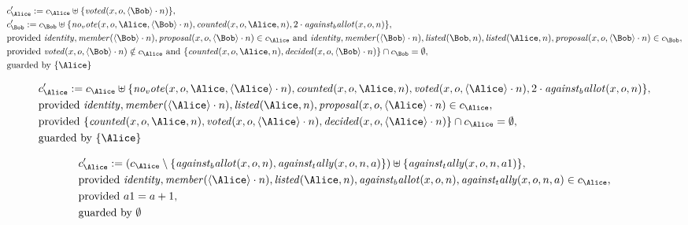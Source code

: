 \begin{align*}
&
c'_
{
\Alice
}
 := 
c_
{
\Alice
}
 \uplus 
\{
\mathit{
voted
}
(
x
,
o
,
\langle
\Bob
\rangle
\cdot
n
)
\}
,\\
&
c'_
{
\Bob
}
 := 
c_
{
\Bob
}
 \uplus 
\{
\mathit{
no_vote
}
(
x
,
o
,
\Alice
,
\langle
\Bob
\rangle
\cdot
n
)
,
\mathit{
counted
}
(
x
,
o
,
\Alice
,
n
)
,
2
\cdot
\mathit{
against_ballot
}
(
x
,
o
,
n
)
\}
,\\
&
\text{provided } 
\mathit{
identity
}
,
\mathit{
member
}
(
\langle
\Bob
\rangle
\cdot
n
)
,
\mathit{
proposal
}
(
x
,
o
,
\langle
\Bob
\rangle
\cdot
n
)
 \in c_
{
\Alice
}
 \text{ and } 
\mathit{
identity
}
,
\mathit{
member
}
(
\langle
\Bob
\rangle
\cdot
n
)
,
\mathit{
listed
}
(
\Bob
,
n
)
,
\mathit{
listed
}
(
\Alice
,
n
)
,
\mathit{
proposal
}
(
x
,
o
,
\langle
\Bob
\rangle
\cdot
n
)
 \in c_
{
\Bob
}
,\\
&
\text{provided } 
\mathit{
voted
}
(
x
,
o
,
\langle
\Bob
\rangle
\cdot
n
)
 \notin c_
{
\Alice
}
 \text{ and } 
\{
\mathit{
counted
}
(
x
,
o
,
\Alice
,
n
)
,
\mathit{
decided
}
(
x
,
o
,
\langle
\Bob
\rangle
\cdot
n
)
\}
 \cap c_
{
\Bob
}
 = \emptyset
,\\
&
\text{guarded by } \{
\Alice
\}
\end{align*}

\begin{align*}
&
c'_
{
\Alice
}
 := 
c_
{
\Alice
}
 \uplus 
\{
\mathit{
no_vote
}
(
x
,
o
,
\Alice
,
\langle
\Alice
\rangle
\cdot
n
)
,
\mathit{
counted
}
(
x
,
o
,
\Alice
,
n
)
,
\mathit{
voted
}
(
x
,
o
,
\langle
\Alice
\rangle
\cdot
n
)
,
2
\cdot
\mathit{
against_ballot
}
(
x
,
o
,
n
)
\}
,\\
&
\text{provided } 
\mathit{
identity
}
,
\mathit{
member
}
(
\langle
\Alice
\rangle
\cdot
n
)
,
\mathit{
listed
}
(
\Alice
,
n
)
,
\mathit{
proposal
}
(
x
,
o
,
\langle
\Alice
\rangle
\cdot
n
)
 \in c_
{
\Alice
}
,\\
&
\text{provided } 
\{
\mathit{
counted
}
(
x
,
o
,
\Alice
,
n
)
,
\mathit{
voted
}
(
x
,
o
,
\langle
\Alice
\rangle
\cdot
n
)
,
\mathit{
decided
}
(
x
,
o
,
\langle
\Alice
\rangle
\cdot
n
)
\}
 \cap c_
{
\Alice
}
 = \emptyset
,\\
&
\text{guarded by } \{
\Alice
\}
\end{align*}

\begin{align*}
&
c'_
{
\Alice
}
 := 
(c_
{
\Alice
}
 \setminus 
\{
\mathit{
against_ballot
}
(
x
,
o
,
n
)
,
\mathit{
against_tally
}
(
x
,
o
,
n
,
a
)
\}
) \uplus 
\{
\mathit{
against_tally
}
(
x
,
o
,
n
,
a1
)
\}
,\\
&
\text{provided } 
\mathit{
identity
}
,
\mathit{
member
}
(
\langle
\Alice
\rangle
\cdot
n
)
,
\mathit{
listed
}
(
\Alice
,
n
)
,
\mathit{
against_ballot
}
(
x
,
o
,
n
)
,
\mathit{
against_tally
}
(
x
,
o
,
n
,
a
)
 \in c_
{
\Alice
}
,\\
&
\text{provided } 
a1
=
a
+ 1
,\\
&
\text{guarded by } \emptyset
\end{align*}
